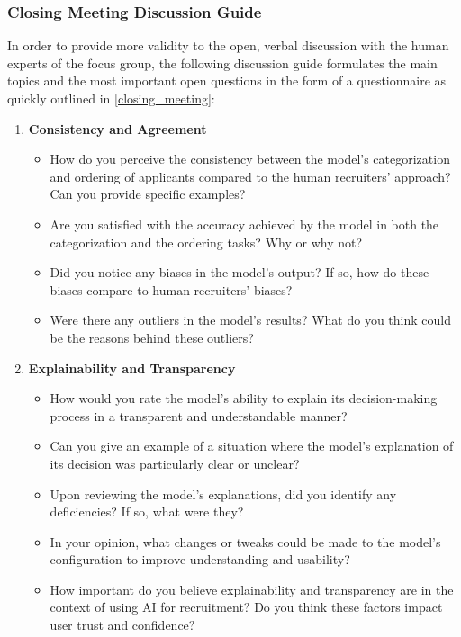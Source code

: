 \documentclass[draft,final]{thesisclass} %
\begin{document}
\subsubsection{Closing Meeting Discussion Guide}
In order to provide more validity to the open, verbal discussion with the human experts of the focus group, the following discussion guide formulates the main topics and the most important open questions in the form of a questionnaire as quickly outlined in \ref{closing_meeting}:
\begin{enumerate}
    \item \textbf{Consistency and Agreement}
    \begin{itemize}
        \item How do you perceive the consistency between the model's categorization and ordering of applicants compared to the human recruiters' approach? Can you provide specific examples?
        \item Are you satisfied with the accuracy achieved by the model in both the categorization and the ordering tasks? Why or why not?
        \item Did you notice any biases in the model's output? If so, how do these biases compare to human recruiters' biases?
        \item Were there any outliers in the model's results? What do you think could be the reasons behind these outliers?
    \end{itemize}
    \item \textbf{Explainability and Transparency}
    \begin{itemize}
        \item How would you rate the model's ability to explain its decision-making process in a transparent and understandable manner?
        \item Can you give an example of a situation where the model's explanation of its decision was particularly clear or unclear?
        \item Upon reviewing the model's explanations, did you identify any deficiencies? If so, what were they?
        \item In your opinion, what changes or tweaks could be made to the model's configuration to improve understanding and usability?
        \item How important do you believe explainability and transparency are in the context of using \acs{AI} for recruitment? Do you think these factors impact user trust and confidence?
    \end{itemize}
\end{enumerate}
\end{document}
